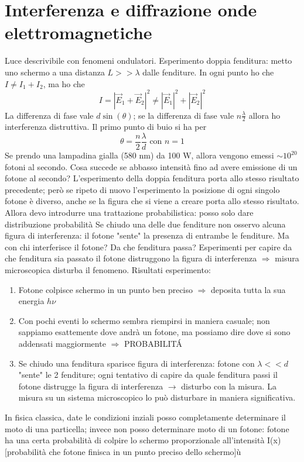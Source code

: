 \section{Interferenza e diffrazione onde elettromagnetiche}
Luce descrivibile con fenomeni ondulatori. \newline
Esperimento doppia fenditura: metto uno schermo a una distanza $L >> \lambda$ dalle fenditure. In ogni punto ho che $ I \neq I_1 + I_2$, ma ho che 
\begin{equation*}
    I = {|\vec{E}_1 + \vec{E}_2|}^2 \neq {|\vec{E}_1|}^2 + {|\vec{E}_2|}^2
\end{equation*}
La differenza di fase vale $d\sin(\theta)$; se la differenza di fase vale $n\frac{\lambda}{2}$ allora ho interferenza distruttiva. Il primo punto di buio si ha per 
\begin{equation*}
    \theta = \frac{n}{2}\frac{\lambda}{d} \text{ con } n=1
\end{equation*}
Se prendo una lampadina gialla (580 nm) da 100 W, allora vengono emessi $\sim 10^{20}$ fotoni al secondo. Cosa succede se abbasso intensità fino ad avere emissione di un fotone al secondo? L'esperimento della doppia fenditura porta allo stesso risultato precedente; però se ripeto di nuovo l'esperimento la posizione di ogni singolo fotone è diverso, anche se la figura che si viene a creare porta allo stesso risultato. Allora devo introdurre una trattazione probabilistica: posso solo dare distribuzione probabilità \newline
Se chiudo una delle due fenditure non osservo alcuna figura di interferenza: il fotone "sente" la presenza di entrambe le fenditure. Ma con chi interferisce il fotone? Da che fenditura passa? \newline
Esperimenti per capire da che fenditura sia passato il fotone distruggono la figura di interferenza $\Rightarrow$ misura microscopica disturba il fenomeno. \newline
Risultati esperimento:
\begin{enumerate}
    \item Fotone colpisce schermo in un punto ben preciso $\Rightarrow$ deposita tutta la sua energia $h\nu$
    \item Con pochi eventi lo schermo sembra riempirsi in maniera casuale; non sappiamo esattemente dove andrà un fotone, ma possiamo dire dove si sono addensati maggiormente $\Rightarrow$ PROBABILIT\'A
    \item Se chiudo una fenditura sparisce figura di interferenza: fotone con $\lambda << d$ "sente" le 2 fenditure; ogni tentativo di capire da quale fenditura passi il fotone distrugge la figura di interferenza $\rightarrow$ disturbo con la misura. La misura su un sistema microscopico lo può disturbare in maniera significativa.
\end{enumerate}
In fisica classica, date le condizioni inziali posso completamente determinare il moto di una particella; invece non posso determinare moto di un fotone: fotone ha una certa probabilità di colpire lo schermo proporzionale all'intensità I(x) [probabilità che fotone finisca in un punto preciso dello schermo]ù

